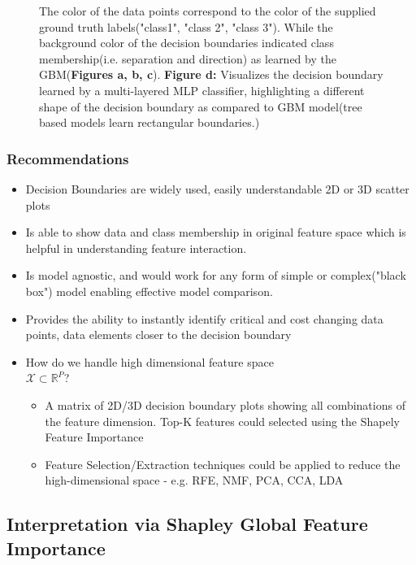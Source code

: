 \documentclass{article}
\begin{document}
\begin{figure}[H]
\begin{subfigure}[tb]{.5\textwidth}
\begin{center}
			\caption{}
			\label{fig:global_db}
		\end{center}
	\end{subfigure}%
	\captionsetup{font=footnotesize}
	\caption{The color of the data points correspond to the color of the supplied ground truth labels("class1", "class 2", "class 3"). While the background color of the decision boundaries indicated class membership(i.e. separation and direction) as learned by the 
	GBM(\textbf{Figures a, b, c}). \textbf{Figure d:} Visualizes the decision boundary learned by a multi-layered MLP classifier, highlighting a different shape of the decision boundary as compared to GBM model(tree based models learn rectangular 
	boundaries.)}
\end{figure}

\subsubsection{Recommendations}
\begin{itemize}
	\item Decision Boundaries are widely used, easily understandable 2D or 3D scatter plots \cite{migut2015visualizing}
	\item Is able to show data and class membership in original feature space which is helpful in understanding feature interaction.
	\item Is model agnostic, and would work for any form of simple or complex("black box") model enabling effective model comparison.
	\item Provides the ability to instantly identify critical and cost changing data points, data elements closer to the decision boundary
	\item How do we handle high dimensional feature space \\ $\mathcal{X} \subset \mathbb{R}^P$?
	\begin{itemize}
		\item A matrix of 2D/3D decision boundary plots showing all combinations of the feature dimension. Top-K features could selected using the Shapely Feature Importance
		\item Feature Selection/Extraction techniques could be applied to reduce the high-dimensional space - e.g. RFE, NMF, PCA, CCA, LDA
	\end{itemize}
\end{itemize}


\subsection{Interpretation via Shapley Global Feature Importance}
\end{document}
